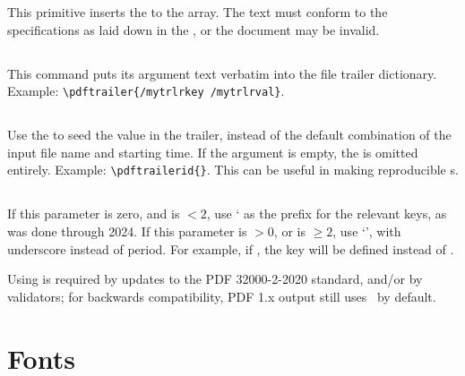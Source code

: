 \documentclass{pdftexmanual}
\begin{document}
This primitive inserts the  to the 
array. The text must conform to the specifications as laid down in the
\PDFReference, or the document may be invalid.

\subsection{}

This command puts its argument text verbatim into the file trailer
dictionary. Example: \verb|\pdftrailer{/mytrlrkey /mytrlrval}|.

\subsection{}

Use the  to seed the  value in the
trailer, instead of the default combination of the input file
name and starting time.  If the argument is empty, the  is
omitted entirely.  Example: \verb|\pdftrailerid{}|.  This can be useful
in making reproducible \PDF{}s.  

\subsection{}

If this parameter is zero, and  is $<2$, use
` as the prefix for the relevant  keys, as was
done through 2024. If this parameter is $>0$, or  is
$\ge2$, use `', with underscore instead of period. For
example, if , the key  will
be defined instead of .

Using \type{_} is required by updates to the PDF 32000-2-2020 standard,
and/or by validators; for backwards compatibility, PDF 1.x output still
uses \ by default.

\section{Fonts}

\subsection{}
\end{document}
